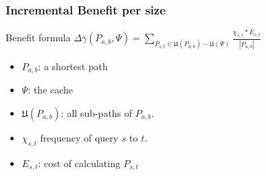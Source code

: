 \begin{frame} %
\frametitle{Incremental Benefit per size} 
  \begin{block}{Benefit formula}
    $\Delta\overline{\gamma}(P_{a,b}, \Psi) = \sum\limits_{P_{s,t} \in \mathfrak{U}(P_{a,b}) - \mathfrak{U}(\Psi)} \frac{\chi_{s,t} * E_{s,t}}{|P_{a,b}|}$
  \end{block}


\begin{itemize}
\item $P_{a,b}$: a shortest path 
\item $\Psi$: the cache 
\item $\mathfrak{U}(P_{a,b})$: all sub-paths of $P_{a,b}$. 
\item $\chi_{s,t}$ frequency of query $s$ to $t$. 
\item $E_{s,t}$: cost of calculating $P_{s,t}$
\end{itemize}

\end{frame}

% 
% 
% 
% 
% 


